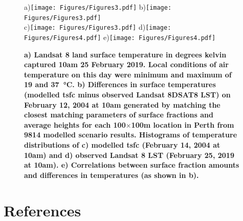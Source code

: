 \documentclass[final,3p,times,authoryear]{elsarticle}
\begin{document}
\begin{figure} 
\centering
a)\texttt{[image: Figures/Figures3.pdf]}
b)\texttt{[image: Figures/Figures3.pdf]}\\
c)\texttt{[image: Figures/Figures3.pdf]}
d)\texttt{[image: Figures/Figures4.pdf]}
e)\texttt{[image: Figures/Figures4.pdf]}
\caption{\bf a) Landsat 8 land surface temperature in degrees kelvin captured 10am 25 February 2019. Local conditions of air temperature on this day were minimum and maximum of 19 and 37\SI{}{\degreeCelsius}. b) Differences in surface temperatures (modelled \gls{tsfc} minus observed Landsat 8DSAT8 LST) on February 12, 2004 at 10am generated by matching the closest matching parameters of surface fractions and average heights for each 100$\times$100m location in Perth from 9814 modelled scenario results. Histograms of temperature distributions of c) modelled \gls{tsfc} (February 14, 2004 at 10am) and d) observed Landsat 8 LST (February 25, 2019 at 10am). e) Correlations between surface fraction amounts and differences in temperatures (as shown in b). }
 \label{fig:Perth-Landsat-LST-25-02-2019}
 \label{fig:Perth-Landsat-TSFC-LST-25-02-2019}
 \label{fig:Perth_TSFC14_85}
\end{figure}

























\printglossaries

\section*{References}\label{sec:ref}
\end{document}
